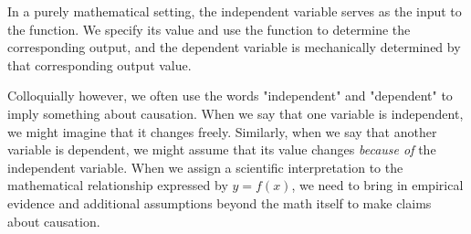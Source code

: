 \documentclass[12pt]{article}
\begin{document}
In a purely mathematical setting, the independent variable serves as the input to the function. We specify its value and use the function to determine the corresponding output, and the dependent variable is mechanically determined by that corresponding output value. 

Colloquially however, we often use the words "independent" and "dependent" to imply something about causation. When we say that one variable is independent, we might imagine that it changes freely. Similarly, when we say that another variable is dependent, we might assume that its value changes \textit{because of} the independent variable. When we assign a scientific interpretation to the mathematical relationship expressed by $y=f(x)$, we need to bring in empirical evidence and additional assumptions beyond the math itself to make claims about causation.
\end{document}
